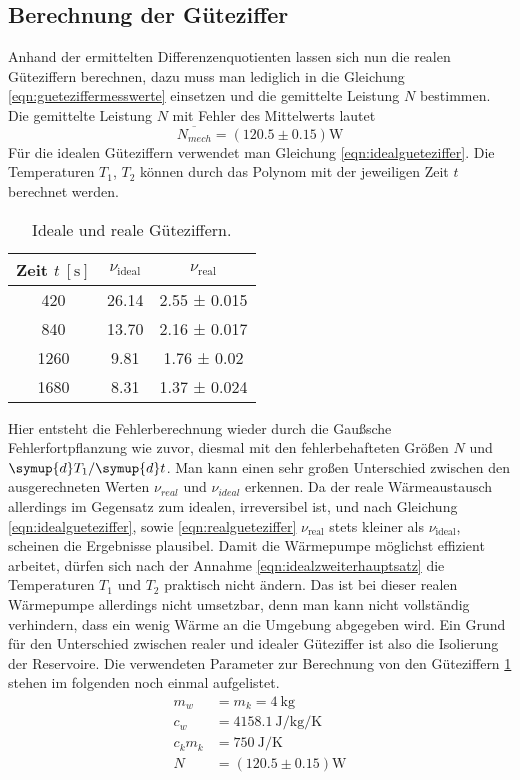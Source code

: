 \subsection{Berechnung der Güteziffer}
Anhand der ermittelten Differenzenquotienten lassen sich nun die realen Güteziffern berechnen, dazu muss man lediglich in die Gleichung \eqref{eqn:gueteziffermesswerte} einsetzen und die
gemittelte Leistung $N$ bestimmen.
Die gemittelte Leistung $N$ mit Fehler des Mittelwerts lautet
\begin{equation}
\overline{N_{mech}} = (120.5 \pm 0.15) \text{W}
\end{equation}
Für die idealen Güteziffern verwendet man Gleichung \eqref{eqn:idealgueteziffer}. Die Temperaturen $T_{1}$, $T_{2}$ können durch das Polynom mit der jeweiligen Zeit $t$ berechnet werden.
\begin{table}
  \centering
  \caption{Ideale und reale Güteziffern.}
  \label{tab:gueteziffernidealundreal}
  \begin{tabular}{c c c}
    \toprule
    Zeit {$t \: [\si{\second}]$} & {$\nu_\text{ideal}$} & {$\nu_\text{real}$} \\
    \midrule
    420  & 26.14 & 2.55 ± 0.015 \\
    840  & 13.70 & 2.16 ± 0.017 \\
    1260  &  9.81 & 1.76 ± 0.02 \\
    1680 &  8.31 & 1.37 ± 0.024\\
    \bottomrule
  \end{tabular}
\end{table}
Hier entsteht die Fehlerberechnung wieder durch die Gaußsche Fehlerfortpflanzung wie zuvor, diesmal mit den fehlerbehafteten Größen $N$ und ${\symup{d}T_{1}}/{\symup{d}t}$.
Man kann einen sehr großen Unterschied zwischen den ausgerechneten Werten $\nu_{real}$ und $\nu_{ideal}$ erkennen. Da der reale Wärmeaustausch allerdings im Gegensatz zum idealen, irreversibel ist,
und nach Gleichung \eqref{eqn:idealgueteziffer}, sowie \eqref{eqn:realgueteziffer} $\nu_{\text{real}}$ stets kleiner als $\nu_{\text{ideal}}$, scheinen die Ergebnisse plausibel.
Damit die Wärmepumpe möglichst effizient arbeitet, dürfen sich nach der Annahme \eqref{eqn:idealzweiterhauptsatz} die Temperaturen $T_{1}$ und $T_{2}$ praktisch nicht ändern.
Das ist bei dieser realen Wärmepumpe allerdings nicht umsetzbar, denn man kann nicht vollständig verhindern, dass ein wenig Wärme an die Umgebung abgegeben wird. Ein Grund für
den Unterschied zwischen realer und idealer Güteziffer ist also die Isolierung der Reservoire.
Die verwendeten Parameter zur Berechnung von den Güteziffern \ref{tab:gueteziffernidealundreal} stehen im folgenden noch einmal aufgelistet.
\begin{align}
m_{w} &= m_{k} = \SI{4}{\kilo\gram} \\
c_{w} &= \SI{4158.1}{\joule\per\kilo\gram\per\kelvin}\\
c_{k}m_{k} &= \SI{750}{\joule\per\kelvin}\\
N &= (120.5 \pm 0.15) \text{W}
\end{align}
